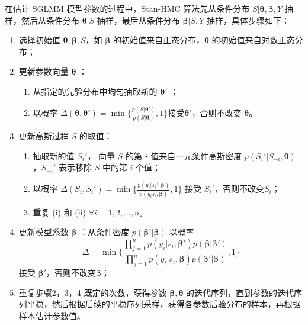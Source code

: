 \documentclass[12pt,a4paper,UTF8,twoside]{book}
\providecommand{\tightlist}{%
  \setlength{\itemsep}{0pt}\setlength{\parskip}{0pt}}
\begin{document}
在估计 SGLMM 模型参数的过程中，Stan-HMC 算法先从条件分布
\(S|\boldsymbol{\theta},\boldsymbol{\beta},Y\) 抽样，然后从条件分布
\(\boldsymbol{\theta}|S\) 抽样，最后从条件分布
\(\boldsymbol{\beta}|S,Y\) 抽样，具体步骤如下：

\begin{enumerate}
\def\labelenumi{\arabic{enumi}.}
\tightlist
\item
  选择初始值 \(\boldsymbol{\theta},\boldsymbol{\beta},S\)，如
  \(\boldsymbol{\beta}\) 的初始值来自正态分布，\(\boldsymbol{\theta}\)
  的初始值来自对数正态分布；
\item
  更新参数向量 \(\boldsymbol{\theta}\) ：

  \begin{enumerate}
  \def\labelenumii{(\roman{enumii})}
  \tightlist
  \item
    从指定的先验分布中均匀抽取新的 \(\boldsymbol{\theta}'\) ；
  \item
    以概率
    \(\Delta(\boldsymbol{\theta},\boldsymbol{\theta}') = \min \big\{\frac{p(S|\boldsymbol{\theta}')}{p(S|\boldsymbol{\theta})},1\big\}\)接受\(\boldsymbol{\theta}'\)，否则不改变
    \(\boldsymbol{\theta}\)。
  \end{enumerate}
\item
  更新高斯过程 \(S\) 的取值：

  \begin{enumerate}
  \def\labelenumii{(\roman{enumii})}
  \tightlist
  \item
    抽取新的值 \(S_{i}'\)， 向量 \(S\) 的第 \(i\) 值来自一元条件高斯密度
    \(p(S_{i}'|S_{-i},\boldsymbol{\theta})\)，\(S_{-i}'\) 表示移除 \(S\)
    中的第 \(i\) 个值；
  \item
    以概率
    \(\Delta(S_{i},S_{i}') = \min\big\{ \frac{p(y_{i}|s_{i}',\boldsymbol{\beta})}{p(y_{i}s_{i},\boldsymbol{\beta})},1 \big\}\)
    接受 \(S_{i}'\)，否则不改变\(S_i\)；
  \item
    重复 (i) 和 (ii) \(\forall i = 1,2,\ldots,n\)。
  \end{enumerate}
\item
  更新模型系数 \(\boldsymbol{\beta}\) ：从条件密度
  \(p(\boldsymbol{\beta}'|\boldsymbol{\beta})\) 以概率
  \[\Delta = \min \big\{ \frac{\prod_{j=1}^{n}p(y_i|s_{i},\boldsymbol{\beta}')p(\boldsymbol{\beta}|\boldsymbol{\beta}')}{\prod_{j=1}^{n}p(y_i|s_{i},\boldsymbol{\beta})p(\boldsymbol{\beta}'|\boldsymbol{\beta})},1  \big\}\]
  接受 \(\boldsymbol{\beta}'\)，否则不改变\(\boldsymbol{\beta}\)；
\item
  重复步骤2，3，4 既定的次数，获得参数
  \(\boldsymbol{\beta},\boldsymbol{\theta}\)
  的迭代序列，直到参数的迭代序列平稳，然后根据后续的平稳序列采样，获得各参数后验分布的样本，再根据样本估计参数值。
\end{enumerate}
\end{document}

